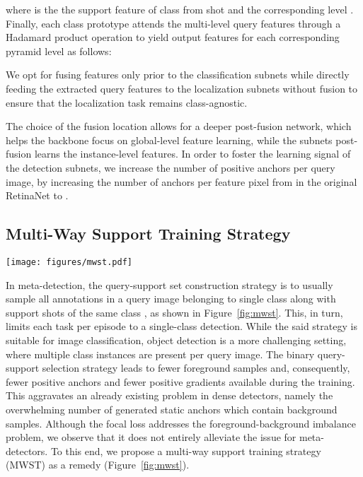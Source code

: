 \documentclass[10pt,twocolumn,letterpaper]{article}
\begin{document}
where  is the the support feature of class  from shot  and the corresponding level .
Finally, each class prototype attends the multi-level query features  through a Hadamard product operation to yield output features  for each corresponding pyramid level  as follows:

We opt for fusing features only prior to the classification subnets while directly feeding the extracted query features to the localization subnets without fusion to ensure that the localization task remains class-agnostic.

The choice of the fusion location allows for a deeper post-fusion network, which helps the backbone focus on global-level feature learning, while the subnets post-fusion learns the instance-level features. In order to foster the learning signal of the detection subnets, we increase the number of positive anchors per query image, by increasing the number of anchors per feature pixel from  in the original RetinaNet to . 

\subsection{Multi-Way Support Training Strategy}
\begin{figure*}[t!]
 \centering
 \texttt{[image: figures/mwst.pdf]}
\caption{ The left image shows the query-support set construction in a contrastive-based settings for the FSOD-RPN~\cite{FSOD-RPN}. Here, one annotation per query image is sampled along with  support shots from the same class annotation and -shots from a random negative class. The MWST algorithm constructs a multi-way query-support set (right), where the query image can include multiple annotations.} \label{fig:mwst}\vspace{-1em}
\end{figure*} In meta-detection, the query-support set construction strategy is to usually sample all annotations in a query image belonging to single class  along with  support shots of the same class \cite{FSRW, FSOD-RPN, FsDetView, DANA}, as shown in Figure~\ref{fig:mwst}. This, in turn, limits each task per episode to a single-class detection. While the said strategy is suitable for image classification, object detection is a more challenging setting, where multiple class instances are present per query image. The binary query-support selection strategy leads to fewer foreground samples and, consequently, fewer positive anchors and fewer positive gradients available during the training. This aggravates an already existing problem in dense detectors, namely the overwhelming number of generated static anchors which contain background samples. Although the focal loss addresses the foreground-background imbalance problem, we observe that it does not entirely alleviate the issue for meta-detectors. To this end, we propose a multi-way support training strategy (MWST) as a remedy (Figure~\ref{fig:mwst}).         
\end{document}
